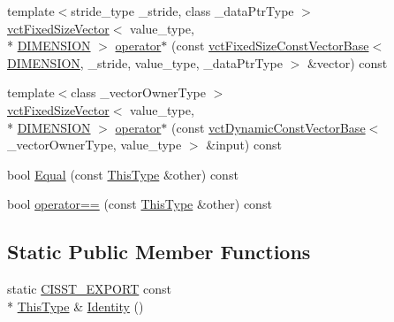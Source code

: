 {\bf }\par
\begin{DoxyCompactItemize}
\item 
{\footnotesize template$<$stride\-\_\-type \-\_\-stride, class \-\_\-data\-Ptr\-Type $>$ }\\\hyperlink{classvct_fixed_size_vector}{vct\-Fixed\-Size\-Vector}$<$ value\-\_\-type, \\*
\hyperlink{classvct_frame_base_a4284a4e875533c13df90a20c0233e043ad25b85efd5e4c2687ddf38ae18cd88f0}{D\-I\-M\-E\-N\-S\-I\-O\-N} $>$ \hyperlink{classvct_frame_base_a695b087db328cf88f2e7fd6b9340a0f4}{operator$\ast$} (const \hyperlink{classvct_fixed_size_const_vector_base}{vct\-Fixed\-Size\-Const\-Vector\-Base}$<$ \hyperlink{classvct_frame_base_a4284a4e875533c13df90a20c0233e043ad25b85efd5e4c2687ddf38ae18cd88f0}{D\-I\-M\-E\-N\-S\-I\-O\-N}, \-\_\-stride, value\-\_\-type, \-\_\-data\-Ptr\-Type $>$ \&vector) const 
\item 
{\footnotesize template$<$class \-\_\-vector\-Owner\-Type $>$ }\\\hyperlink{classvct_fixed_size_vector}{vct\-Fixed\-Size\-Vector}$<$ value\-\_\-type, \\*
\hyperlink{classvct_frame_base_a4284a4e875533c13df90a20c0233e043ad25b85efd5e4c2687ddf38ae18cd88f0}{D\-I\-M\-E\-N\-S\-I\-O\-N} $>$ \hyperlink{classvct_frame_base_af220c27b4b9834ca0af5483cf6b37fca}{operator$\ast$} (const \hyperlink{classvct_dynamic_const_vector_base}{vct\-Dynamic\-Const\-Vector\-Base}$<$ \-\_\-vector\-Owner\-Type, value\-\_\-type $>$ \&input) const 
\end{DoxyCompactItemize}

{\bf }\par
\begin{DoxyCompactItemize}
\item 
bool \hyperlink{classvct_frame_base_a2917142640685587e1382b51c6df8a21}{Equal} (const \hyperlink{classvct_frame_base_a076f1fe4fc957faa0d1ff7450d1cb768}{This\-Type} \&other) const 
\item 
bool \hyperlink{classvct_frame_base_acd0790eec08a99bcd5c50465509d171f}{operator==} (const \hyperlink{classvct_frame_base_a076f1fe4fc957faa0d1ff7450d1cb768}{This\-Type} \&other) const 
\end{DoxyCompactItemize}

\subsection*{Static Public Member Functions}
\begin{DoxyCompactItemize}
\item 
static \hyperlink{cmn_export_macros_8h_a99393e0c3ac434b2605235bbe20684f8}{C\-I\-S\-S\-T\-\_\-\-E\-X\-P\-O\-R\-T} const \\*
\hyperlink{classvct_frame_base_a076f1fe4fc957faa0d1ff7450d1cb768}{This\-Type} \& \hyperlink{classvct_frame_base_a75cf198b35e4b782326105a1aa414a25}{Identity} ()
\end{DoxyCompactItemize}
